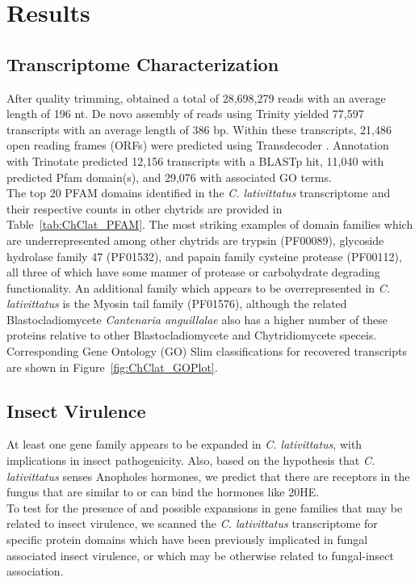 \section{Results}
\subsection*{Transcriptome Characterization}
After quality trimming, obtained a total of 28,698,279 reads with an average length of 196 nt. De novo assembly of reads using Trinity \cite{Grabherr2011} yielded 77,597 transcripts with an average length of 386 bp. Within these transcripts, 21,486 open reading frames (ORFs) were predicted using Transdecoder \cite{Haas2013}. Annotation with Trinotate predicted 12,156 transcripts with a BLASTp hit, 11,040 with predicted Pfam domain(s), and 29,076 with associated GO terms. \\
\indent The top 20 PFAM domains identified in the \textit{C. lativittatus} transcriptome and their respective counts in other chytrids are provided in Table~\ref{tab:ChClat_PFAM}. The most striking examples of domain families which are underrepresented among other chytrids are trypsin (PF00089), glycoside hydrolase family 47 (PF01532), and papain family cysteine protease (PF00112), all three of which have some manner of protease or carbohydrate degrading functionality. An additional family which appears to be overrepresented in \textit{C. lativittatus} is the Myosin tail family (PF01576), although the related Blastocladiomycete \textit{Cantenaria anguillalae} also has a higher number of these proteins relative to other Blastocladiomycete and Chytridiomycete speceis. Corresponding Gene Ontology (GO) Slim classifications for recovered transcripts are shown in Figure~\ref{fig:ChClat_GOPlot}. \\
\subsection*{Insect Virulence} 
At least one gene family appears to be expanded in \textit{C. lativittatus}, with implications in insect pathogenicity. Also, based on the hypothesis that \textit{C. lativittatus} senses Anopholes hormones, we predict that there are receptors in the fungus that are similar to or can bind the hormones like 20HE. \\
\indent To test for the presence of and possible expansions in gene families that may be related to insect virulence, we scanned the \textit{C. lativittatus} transcriptome for specific protein domains which have been previously implicated in fungal associated insect virulence, or which may be otherwise related to fungal-insect association. \\
